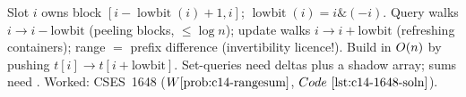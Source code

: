 \begin{recallbox}
Slot \(i\) owns block \([i{-}\operatorname{lowbit}(i){+}1,i]\);
\(\operatorname{lowbit}(i)=i\mathbin{\&}(-i)\).  Query walks \(i\to i{-}\text{lowbit}\)
(peeling blocks, \(\le\log n\)); update walks \(i\to i{+}\text{lowbit}\)
(refreshing containers); range \(=\) prefix difference (invertibility
licence!).  Build in \(O(n)\) by pushing \(t[i]\to t[i{+}\text{lowbit}]\).
Set-queries need deltas plus a shadow array; sums need .
Worked: CSES~1648 (\(\probref{c14-rangesum}\), \(\coderef{c14-1648-soln}\)).
\end{recallbox}
